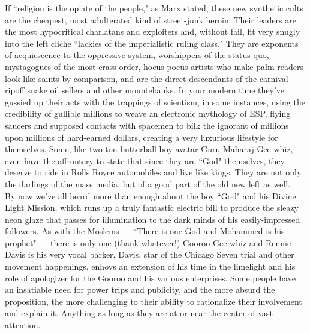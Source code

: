 \documentclass[12pt, onecolumn, letterpaper, oneside]{book}
\begin{document}
If ``religion is the opiate of the people," as Marx stated, these new synthetic cults are the cheapest, most adulterated kind of street-junk heroin. Their leaders are the most hypocritical charlatans and exploiters and, without fail, fit very snugly into the left cliche ``lackies of the imperialistic ruling class." They are exponents of acquiescence to the oppressive system, worshippers of the status quo, mystagogues of the most crass order, hocus-pocus artists who make palm-readers look like saints by comparison, and are the direct descendants of the carnival ripoff snake oil sellers and other mountebanks. In your modern time they've gussied up their acts with the trappings of scientism, in some instances, using the credibility of gullible millions to weave an electronic mythology of ESP, flying saucers and supposed contacts with spacemen to bilk the ignorant of millions upon millions of hard-earned dollars, creating a very luxurious lifestyle for themselves. Some, like two-ton butterball boy avatar Guru Maharaj Gee-whiz, even have the affrontery to state that since they are ``God" themselves, they deserve to ride in Rolls Royce automobiles and live like kings. They are not only the darlings of the mass media, but of a good part of the old new left as well.\\
By now we've all heard more than enough about the boy ``God" and his Divine Light Mission, which runs up a truly fantastic electric bill to produce the sleazy neon glaze that passes for illumination to the dark minds of his easily-impressed followers. As with the Moslems --- ``There is one God and Mohammed is his prophet" --- there is only one (thank whatever!) Gooroo Gee-whiz and Rennie Davis is his very vocal barker. Davis, star of the Chicago Seven trial and other movement happenings, enhoys an extension of his time in the limelight and his role of apologizer for the Gooroo and his various enterprises. Some people have an insatiable need for power trips and publicity, and the more absurd the proposition, the more challenging to their ability to rationalize their involvement and explain it. Anything as long as they are at or near the center of vast attention.\\
\end{document}
